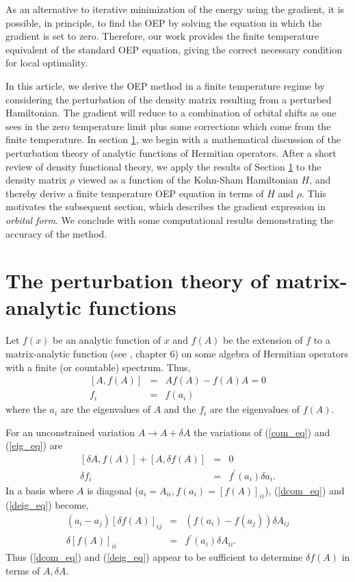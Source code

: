 \documentclass{article}
\newcommand{\bea}{\begin{eqnarray}} \newcommand{\ena}{\end{eqnarray}}
\begin{document}
As an alternative to iterative minimization of the energy using the gradient,
it is possible, in principle, to find the OEP by solving the equation in
which the gradient is set to zero.  Therefore, our work provides the finite
temperature equivalent of the standard OEP equation, giving the correct
necessary condition for local optimality.

In this article, we derive the OEP method in a finite temperature regime
by considering the perturbation of the density matrix resulting from a
perturbed Hamiltonian.
The gradient will reduce to a combination of orbital shifts as one sees
in the zero temperature limit plus some corrections which come from the
finite temperature.  In section \ref{pert_sec}, we begin with a mathematical discussion
of the perturbation theory of analytic functions of Hermitian operators.
After a short review of density functional theory, we apply the results
of Section \ref{pert_sec} to the density matrix $\rho$ viewed as a function of
the Kohn-Sham Hamiltonian $H$, and thereby derive a finite temperature OEP
equation in terms of $H$ and $\rho$.   This motivates the subsequent
section, which describes the gradient expression in {\em orbital form}.
We conclude with some computational results demonstrating the accuracy
of the method.

\section{The perturbation theory of matrix-analytic functions}

\label{pert_sec}
Let $f(x)$ be an analytic function of $x$ and $f(A)$ be the
extension of $f$ to a matrix-analytic function
(see \cite{HornJohnson.book:91}, chapter 6) on some algebra of
Hermitian operators with a finite (or countable) spectrum.  Thus,
\bea
\label{com_eq}
 [A, f(A)] &=& A f(A) - f(A) A = 0\\
\label{eig_eq}
 f_i &=& f(a_i)
\ena
where the $a_i$ are the eigenvalues of $A$ and the $f_i$ are
the eigenvalues of $f(A)$.

For an unconstrained variation $A \rightarrow A + \delta A$
the variations of (\ref{com_eq}) and (\ref{eig_eq}) are
\bea
\label{dcom_eq}
 [\delta A, f(A)]+[A, \delta f(A)] &=& 0\\
\label{deig_eq}
 \delta f_i &=& f^\prime (a_i) \delta a_i.
\ena
In a basis where $A$ is diagonal
($a_i = A_{ii}, f(a_i) = \left[f(A)\right]_{ii}$),
(\ref{dcom_eq}) and (\ref{deig_eq}) become,
\bea
\label{ddcom_eq}
 (a_i - a_j) \left[\delta f(A)\right]_{ij} &=&  (f(a_i) - f(a_j)) \delta A_{ij}\\
\label{ddeig_eq}
 \delta \left[f(A)\right]_{ii} &=& f^\prime (a_i) \delta A_{ii}.
\ena
Thus (\ref{dcom_eq}) and (\ref{deig_eq})
appear to be sufficient to determine $\delta f(A)$ in terms of $A,\delta A$.
\end{document}
